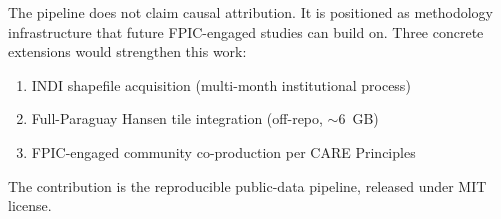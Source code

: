 The pipeline does not claim causal attribution. It is positioned as
methodology infrastructure that future FPIC-engaged studies can
build on. Three concrete extensions would strengthen this work:

\begin{enumerate}
\item INDI shapefile acquisition (multi-month institutional process)
\item Full-Paraguay Hansen tile integration (off-repo, $\sim$6~GB)
\item FPIC-engaged community co-production per CARE Principles
\end{enumerate}

The contribution is the reproducible public-data pipeline, released
under MIT license.
